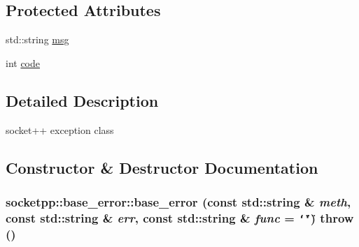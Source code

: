 \subsection*{Protected Attributes}
\begin{CompactItemize}
\item 
std::string \hyperlink{classsocketpp_1_1base__error_e4980949d1cd995e69cfa7cc9d110805}{msg}
\item 
int \hyperlink{classsocketpp_1_1base__error_131ddb6f4303ff562b49a6ff2b7f7328}{code}
\end{CompactItemize}


\subsection{Detailed Description}
socket++ exception class 

\subsection{Constructor \& Destructor Documentation}
\hypertarget{classsocketpp_1_1base__error_bee6b6851dbaecf96259bd2dcaa84ef9}{
\subsubsection[{base\_\-error}]{\setlength{\rightskip}{0pt plus 5cm}socketpp::base\_\-error::base\_\-error (const std::string \& {\em meth}, \/  const std::string \& {\em err}, \/  const std::string \& {\em func} = {\tt \char`\"{}\char`\"{}})  throw ()}}
\label{classsocketpp_1_1base__error_bee6b6851dbaecf96259bd2dcaa84ef9}


